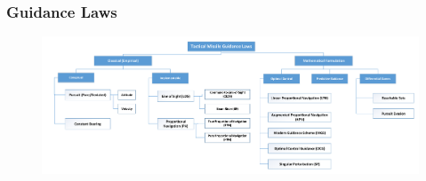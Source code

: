 \documentclass{beamer}
\begin{document}
\begin{frame}
\frametitle{Guidance Laws}
\begin{figure}[H]
	\centering
	\includegraphics[scale = 0.24]{fig/GuidanceLaws.pdf}
\end{figure}
\end{frame}


\end{document}
